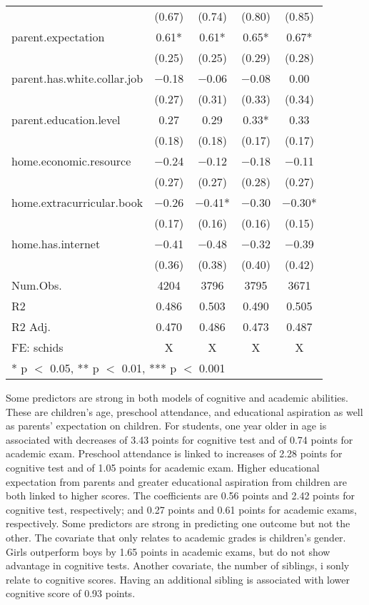 \documentclass[
  man]{apa7}
\begin{document}
\begin{table}
\begin{tabular}[t]{lcccc}
 & (\num{0.67}) & (\num{0.74}) & (\num{0.80}) & (\num{0.85})\\
parent.expectation & \num{0.61}* & \num{0.61}* & \num{0.65}* & \num{0.67}*\\
 & (\num{0.25}) & (\num{0.25}) & (\num{0.29}) & (\num{0.28})\\
parent.has.white.collar.job & \num{-0.18} & \num{-0.06} & \num{-0.08} & \num{0.00}\\
 & (\num{0.27}) & (\num{0.31}) & (\num{0.33}) & (\num{0.34})\\
parent.education.level & \num{0.27} & \num{0.29} & \num{0.33}* & \num{0.33}\\
 & (\num{0.18}) & (\num{0.18}) & (\num{0.17}) & (\num{0.17})\\
home.economic.resource & \num{-0.24} & \num{-0.12} & \num{-0.18} & \num{-0.11}\\
 & (\num{0.27}) & (\num{0.27}) & (\num{0.28}) & (\num{0.27})\\
home.extracurricular.book & \num{-0.26} & \num{-0.41}* & \num{-0.30} & \num{-0.30}*\\
 & (\num{0.17}) & (\num{0.16}) & (\num{0.16}) & (\num{0.15})\\
home.has.internet & \num{-0.41} & \num{-0.48} & \num{-0.32} & \num{-0.39}\\
 & (\num{0.36}) & (\num{0.38}) & (\num{0.40}) & (\num{0.42})\\
\midrule
Num.Obs. & \num{4204} & \num{3796} & \num{3795} & \num{3671}\\
R2 & \num{0.486} & \num{0.503} & \num{0.490} & \num{0.505}\\
R2 Adj. & \num{0.470} & \num{0.486} & \num{0.473} & \num{0.487}\\
FE: schids & X & X & X & X\\
\bottomrule
\multicolumn{5}{l}{\rule{0pt}{1em}* p $<$ 0.05, ** p $<$ 0.01, *** p $<$ 0.001}\\
\end{tabular}
\end{table}

Some predictors are strong in both models of cognitive and academic abilities. These are children's age, preschool attendance, and educational aspiration as well as parents' expectation on children. For students, one year older in age is associated with decreases of 3.43 points for cognitive test and of 0.74 points for academic exam. Preschool attendance is linked to increases of 2.28 points for cognitive test and of 1.05 points for academic exam. Higher educational expectation from parents and greater educational aspiration from children are both linked to higher scores. The coefficients are 0.56 points and 2.42 points for cognitive test, respectively; and 0.27 points and 0.61 points for academic exams, respectively. Some predictors are strong in predicting one outcome but not the other. The covariate that only relates to academic grades is children's gender. Girls outperform boys by 1.65 points in academic exams, but do not show advantage in cognitive tests. Another covariate, the number of siblings, i sonly relate to cognitive scores. Having an additional sibling is associated with lower cognitive score of 0.93 points.
\end{document}
